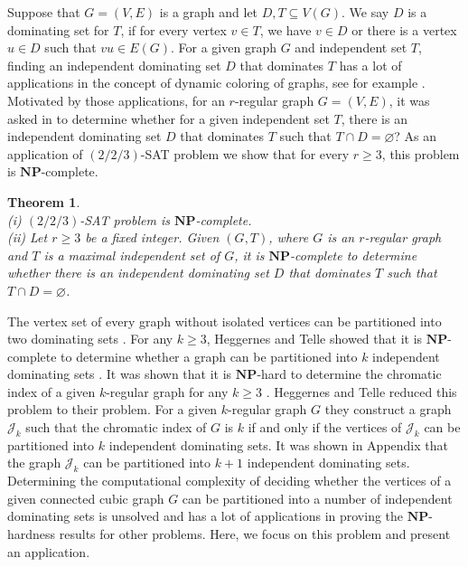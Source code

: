 \documentclass[
final
]{dmtcs-episciences}
\newtheorem{prethm}{{\bf Theorem}}
\newenvironment{thm}{\begin{prethm}{\hspace{-0.5
				em}{\bf}}}{\end{prethm}}
\begin{document}
Suppose that $G=(V,E)$ is a  graph and let $D,T \subseteq V(G) $.
We say $D$ is a dominating set for $T$, if
for every vertex $v\in T$, we have $v\in D$ or there is a vertex $u\in D$ such that $vu\in E(G)$. 
For a given graph $G$ and independent set $T$, finding an independent dominating set $D$ that dominates $T$ has a lot of applications in the concept of dynamic coloring of graphs, see for example \cite{MR2935408, dehhh, MR3679602}. 
Motivated by those applications, 
for an $r$-regular graph $G = (V,E)$,  it was asked in \cite{dehhh} to determine whether for a given independent set $T $, there is an independent dominating set $D$ that dominates $T$ such that $  T  \cap D =\varnothing $?
As an application of $(2/2/3)$-SAT problem we show that  for every $r\geq 3$, this problem is  $ \mathbf{NP} $-complete.




\begin{thm}\label{thm1}\\
	(i) $(2/2/3)$-SAT problem is $ \mathbf{NP} $-complete.\\
	(ii) Let $r\geq 3$ be a fixed integer. Given $(G,T)$, where $G$ is an $r$-regular graph and $T$ is  a  maximal independent set of $G$, it  is $ \mathbf{NP} $-complete to determine whether
	there is an independent dominating set $D$ that dominates $T $ such that $  T \cap D =\varnothing $.
\end{thm}


The vertex set of every graph without isolated vertices can be
partitioned into two dominating sets \cite{ID3}.
For any  $k \geq 3$, Heggernes and Telle   showed that it is $ \mathbf{NP} $-complete to determine whether a graph can
be partitioned into $k$ independent dominating sets \cite{HT}.
It was shown that it is $ \mathbf{NP} $-hard to determine the chromatic index of a given $k$-regular graph for any $k \geq 3$ \cite{MR689264}. Heggernes and Telle  reduced this problem to their problem. For a given $k$-regular graph $G$ they construct a graph $\mathcal{J}_k$ such that the chromatic index of $G$ is $k$ if and only if the vertices of  $\mathcal{J}_k$ can be partitioned into $k$ independent dominating sets.
It was shown in Appendix that the graph $\mathcal{J}_k$ can be partitioned into $k+1$ independent dominating sets. Determining the computational complexity of deciding whether the vertices of a given connected cubic graph $G$ can be partitioned into a number of independent dominating sets is unsolved and has a lot of applications in proving the  $\mathbf{NP} $-hardness results for other problems.
Here, we focus on this problem and present an application.
\end{document}
